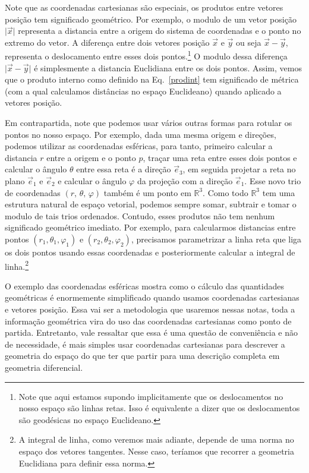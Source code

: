 Note que as coordenadas cartesianas são especiais, os produtos entre vetores
posição tem significado geométrico. Por exemplo, o modulo de um vetor posição
$\vert\vec{x}\vert$ representa a distancia entre a origem do sistema de
coordenadas e o ponto no extremo do vetor. A diferença entre dois vetores
posição $\vec{x}$ e $\vec{y}$ ou seja $\vec{x}-\vec{y}$, representa o
deslocamento entre esses dois pontos.\footnote{Note que aqui estamos supondo
	implicitamente que os deslocamentos no nosso espaço são linhas retas. Isso é
	equivalente a dizer que os deslocamentos são geodésicas no espaço Euclideano.} O
modulo dessa diferença $\vert\vec{x}-\vec{y}\vert$ é simplesmente a distancia
Euclidiana entre os dois pontos. Assim, vemos que o produto interno como
definido na Eq.~\eqref{prodint} tem significado de métrica (com a qual
calculamos distâncias no espaço Euclideano) quando aplicado a vetores posição.

Em contrapartida, note que podemos usar vários outras formas para rotular os
pontos no nosso espaço. Por exemplo, dada uma mesma origem e direções, podemos
utilizar as coordenadas esféricas, para tanto, primeiro calcular a distancia $r$
entre a origem e o ponto $p$, traçar uma reta entre esses dois pontos e calcular
o ângulo $\theta$ entre essa reta é a direção $\vec{e}_3$, em seguida projetar a
reta no plano $\vec{e}_1$ e $\vec{e}_2$ e calcular o ângulo $\varphi$ da
projeção com a direção $\vec{e}_1$. Esse novo trio de coordenadas
$(r,\,\theta,\,\varphi)$ também é um ponto em $\mathbb{R}^3$. Como todo
$\mathbb{R}^3$ tem uma estrutura natural de espaço vetorial, podemos sempre
somar, subtrair e tomar o modulo de tais trios ordenados. Contudo, esses
produtos não tem nenhum significado geométrico imediato. Por exemplo, para
calcularmos distancias entre pontos $(r_1, \theta_1, \varphi_1)$ e $(r_2,
	\theta_2, \varphi_2)$, precisamos parametrizar a linha reta que liga os dois
pontos usando essas coordenadas e posteriormente calcular a integral de
linha.\footnote{A integral de linha, como veremos mais adiante, depende de uma
	norma no espaço dos vetores tangentes. Nesse caso, teríamos que recorrer a
	geometria Euclidiana para definir essa norma.}

O exemplo das coordenadas esféricas mostra como o cálculo das quantidades
geométricas é enormemente simplificado quando usamos coordenadas cartesianas e
vetores posição. Essa vai ser a metodologia que usaremos nessas notas, toda a
informação geométrica vira do uso das coordenadas cartesianas como ponto de
partida. Entretanto, vale ressaltar que essa é uma questão de conveniência e não
de necessidade, é mais simples usar coordenadas cartesianas para descrever a
geometria do espaço do que ter que partir para uma descrição completa em
geometria diferencial.

